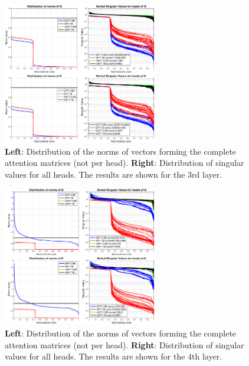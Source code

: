 \documentclass{article} %
\begin{document}
\begin{figure}[t]
\begin{center}
    \includegraphics[width=0.6\textwidth]{qkvL2.eps} 
\caption{\label{fig_qkLayer3} \textbf{Left}: Distribution of the norms of vectors forming the complete attention matrices (not per head).
\textbf{Right}: Distribution of singular values for all heads. The results are shown for the 3rd layer.}  
\end{center}
\end{figure}

\clearpage
\begin{figure}[t]
\begin{center}
    \includegraphics[width=0.6\textwidth]{qkvL3.eps} 
\caption{\label{fig_qkLayer4} \textbf{Left}: Distribution of the norms of vectors forming the complete attention matrices (not per head).
\textbf{Right}: Distribution of singular values for all heads. The results are shown for the 4th layer.} 
\end{center}
\end{figure}
\end{document}
